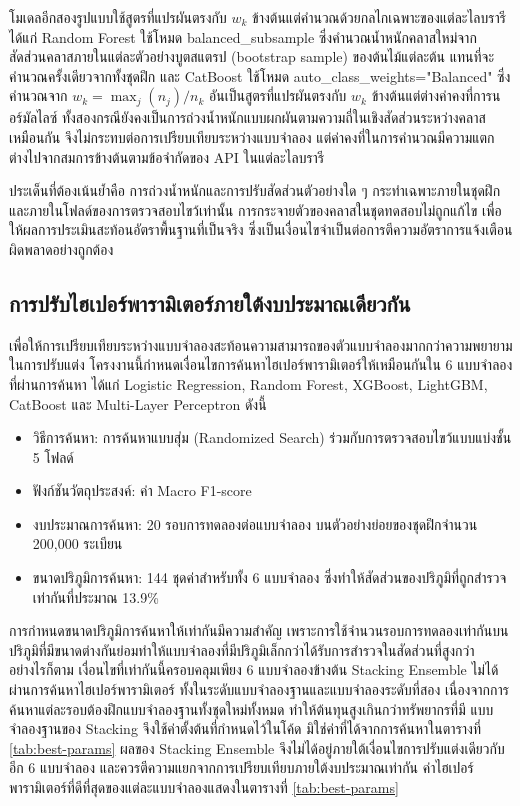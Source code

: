 โมเดลอีกสองรูปแบบใช้สูตรที่แปรผันตรงกับ $w_k$ ข้างต้นแต่คำนวณด้วยกลไกเฉพาะของแต่ละไลบรารี ได้แก่ Random Forest ใช้โหมด balanced\_subsample ซึ่งคำนวณน้ำหนักคลาสใหม่จากสัดส่วนคลาสภายในแต่ละตัวอย่างบูตสแตรป (bootstrap sample) ของต้นไม้แต่ละต้น แทนที่จะคำนวณครั้งเดียวจากทั้งชุดฝึก และ CatBoost ใช้โหมด auto\_class\_weights="Balanced" ซึ่งคำนวณจาก $w_k = \max_j(n_j) / n_k$ อันเป็นสูตรที่แปรผันตรงกับ $w_k$ ข้างต้นแต่ต่างค่าคงที่การนอร์มัลไลซ์ ทั้งสองกรณียังคงเป็นการถ่วงน้ำหนักแบบผกผันตามความถี่ในเชิงสัดส่วนระหว่างคลาสเหมือนกัน จึงไม่กระทบต่อการเปรียบเทียบระหว่างแบบจำลอง แต่ค่าคงที่ในการคำนวณมีความแตกต่างไปจากสมการข้างต้นตามข้อจำกัดของ API ในแต่ละไลบรารี

ประเด็นที่ต้องเน้นย้ำคือ การถ่วงน้ำหนักและการปรับสัดส่วนตัวอย่างใด ๆ กระทำเฉพาะภายในชุดฝึกและภายในโฟลด์ของการตรวจสอบไขว้เท่านั้น การกระจายตัวของคลาสในชุดทดสอบไม่ถูกแก้ไข เพื่อให้ผลการประเมินสะท้อนอัตราพื้นฐานที่เป็นจริง ซึ่งเป็นเงื่อนไขจำเป็นต่อการตีความอัตราการแจ้งเตือนผิดพลาดอย่างถูกต้อง \cite{axelsson2000baserate}

\subsection{การปรับไฮเปอร์พารามิเตอร์ภายใต้งบประมาณเดียวกัน}

เพื่อให้การเปรียบเทียบระหว่างแบบจำลองสะท้อนความสามารถของตัวแบบจำลองมากกว่าความพยายามในการปรับแต่ง โครงงานนี้กำหนดเงื่อนไขการค้นหาไฮเปอร์พารามิเตอร์ให้เหมือนกันใน 6 แบบจำลองที่ผ่านการค้นหา ได้แก่ Logistic Regression, Random Forest, XGBoost, LightGBM, CatBoost และ Multi-Layer Perceptron ดังนี้

\begin{itemize}
    \item วิธีการค้นหา: การค้นหาแบบสุ่ม (Randomized Search) ร่วมกับการตรวจสอบไขว้แบบแบ่งชั้น 5 โฟลด์
    \item ฟังก์ชันวัตถุประสงค์: ค่า Macro F1-score
    \item งบประมาณการค้นหา: 20 รอบการทดลองต่อแบบจำลอง บนตัวอย่างย่อยของชุดฝึกจำนวน 200,000 ระเบียน
    \item ขนาดปริภูมิการค้นหา: 144 ชุดค่าสำหรับทั้ง 6 แบบจำลอง ซึ่งทำให้สัดส่วนของปริภูมิที่ถูกสำรวจเท่ากันที่ประมาณ 13.9\%
\end{itemize}

การกำหนดขนาดปริภูมิการค้นหาให้เท่ากันมีความสำคัญ เพราะการใช้จำนวนรอบการทดลองเท่ากันบนปริภูมิที่มีขนาดต่างกันย่อมทำให้แบบจำลองที่มีปริภูมิเล็กกว่าได้รับการสำรวจในสัดส่วนที่สูงกว่า อย่างไรก็ตาม เงื่อนไขที่เท่ากันนี้ครอบคลุมเพียง 6 แบบจำลองข้างต้น Stacking Ensemble ไม่ได้ผ่านการค้นหาไฮเปอร์พารามิเตอร์ ทั้งในระดับแบบจำลองฐานและแบบจำลองระดับที่สอง เนื่องจากการค้นหาแต่ละรอบต้องฝึกแบบจำลองฐานทั้งชุดใหม่ทั้งหมด ทำให้ต้นทุนสูงเกินกว่าทรัพยากรที่มี แบบจำลองฐานของ Stacking จึงใช้ค่าตั้งต้นที่กำหนดไว้ในโค้ด มิใช่ค่าที่ได้จากการค้นหาในตารางที่ \ref{tab:best-params} ผลของ Stacking Ensemble จึงไม่ได้อยู่ภายใต้เงื่อนไขการปรับแต่งเดียวกับอีก 6 แบบจำลอง และควรตีความแยกจากการเปรียบเทียบภายใต้งบประมาณเท่ากัน ค่าไฮเปอร์พารามิเตอร์ที่ดีที่สุดของแต่ละแบบจำลองแสดงในตารางที่ \ref{tab:best-params}


